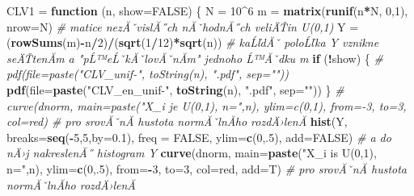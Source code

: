 \documentclass[
]{article}
\newenvironment{Shaded}{\begin{snugshade}}{\end{snugshade}}
\newcommand{\AttributeTok}[1]{\textcolor[rgb]{0.13,0.29,0.53}{#1}}
\newcommand{\CommentTok}[1]{\textcolor[rgb]{0.56,0.35,0.01}{\textit{#1}}}
\newcommand{\ConstantTok}[1]{\textcolor[rgb]{0.56,0.35,0.01}{#1}}
\newcommand{\ControlFlowTok}[1]{\textcolor[rgb]{0.13,0.29,0.53}{\textbf{#1}}}
\newcommand{\DecValTok}[1]{\textcolor[rgb]{0.00,0.00,0.81}{#1}}
\newcommand{\FloatTok}[1]{\textcolor[rgb]{0.00,0.00,0.81}{#1}}
\newcommand{\FunctionTok}[1]{\textcolor[rgb]{0.13,0.29,0.53}{\textbf{#1}}}
\newcommand{\NormalTok}[1]{#1}
\newcommand{\OtherTok}[1]{\textcolor[rgb]{0.56,0.35,0.01}{#1}}
\newcommand{\SpecialCharTok}[1]{\textcolor[rgb]{0.81,0.36,0.00}{\textbf{#1}}}
\newcommand{\StringTok}[1]{\textcolor[rgb]{0.31,0.60,0.02}{#1}}
\begin{document}
\begin{Shaded}
\begin{Highlighting}[]
\NormalTok{CLV1 }\OtherTok{=} \ControlFlowTok{function}\NormalTok{ (n, }\AttributeTok{show=}\ConstantTok{FALSE}\NormalTok{) \{}
\NormalTok{  N }\OtherTok{=} \DecValTok{10}\SpecialCharTok{\^{}}\DecValTok{6}
\NormalTok{  m }\OtherTok{=} \FunctionTok{matrix}\NormalTok{(}\FunctionTok{runif}\NormalTok{(n}\SpecialCharTok{*}\NormalTok{N, }\DecValTok{0}\NormalTok{,}\DecValTok{1}\NormalTok{), }\AttributeTok{nrow=}\NormalTok{N)     }\CommentTok{\# matice nezĂˇvislĂ˝ch nĂˇhodnĂ˝ch veliÄŤin U(0,1)}
\NormalTok{  Y }\OtherTok{=}\NormalTok{ (}\FunctionTok{rowSums}\NormalTok{(m)}\SpecialCharTok{{-}}\NormalTok{n}\SpecialCharTok{/}\DecValTok{2}\NormalTok{)}\SpecialCharTok{/}\NormalTok{(}\FunctionTok{sqrt}\NormalTok{(}\DecValTok{1}\SpecialCharTok{/}\DecValTok{12}\NormalTok{)}\SpecialCharTok{*}\FunctionTok{sqrt}\NormalTok{(n)) }\CommentTok{\# kaĹľdĂˇ poloĹľka Y vznikne seÄŤtenĂ­m a "pĹ™eĹˇkĂˇlovĂˇnĂ­m" jednoho Ĺ™Ăˇdku m}
  \ControlFlowTok{if}\NormalTok{ (}\SpecialCharTok{!}\NormalTok{show)  \{ }
\CommentTok{\#    pdf(file=paste("CLV\_unif{-}", toString(n), ".pdf", sep=""))}
    \FunctionTok{pdf}\NormalTok{(}\AttributeTok{file=}\FunctionTok{paste}\NormalTok{(}\StringTok{"CLV\_en\_unif{-}"}\NormalTok{, }\FunctionTok{toString}\NormalTok{(n), }\StringTok{".pdf"}\NormalTok{, }\AttributeTok{sep=}\StringTok{""}\NormalTok{))    }
\NormalTok{  \}}
\CommentTok{\#  curve(dnorm, main=paste("X\_i je U(0,1), n=",n), ylim=c(0,1), from={-}3, to=3, col=\textquotesingle{}red\textquotesingle{})        \# pro srovĂˇnĂ­ hustota normĂˇlnĂ­ho rozdÄ›lenĂ­ }
  \FunctionTok{hist}\NormalTok{(Y, }\AttributeTok{breaks=}\FunctionTok{seq}\NormalTok{(}\SpecialCharTok{{-}}\DecValTok{5}\NormalTok{,}\DecValTok{5}\NormalTok{,}\AttributeTok{by=}\FloatTok{0.1}\NormalTok{), }\AttributeTok{freq =} \ConstantTok{FALSE}\NormalTok{, }\AttributeTok{ylim=}\FunctionTok{c}\NormalTok{(}\DecValTok{0}\NormalTok{,.}\DecValTok{5}\NormalTok{), }\AttributeTok{add=}\ConstantTok{FALSE}\NormalTok{) }\CommentTok{\# a do nÄ›j nakreslenĂ˝ histogram Y}
  \FunctionTok{curve}\NormalTok{(dnorm, }\AttributeTok{main=}\FunctionTok{paste}\NormalTok{(}\StringTok{"X\_i is U(0,1), n="}\NormalTok{,n), }\AttributeTok{ylim=}\FunctionTok{c}\NormalTok{(}\DecValTok{0}\NormalTok{,.}\DecValTok{5}\NormalTok{), }\AttributeTok{from=}\SpecialCharTok{{-}}\DecValTok{3}\NormalTok{, }\AttributeTok{to=}\DecValTok{3}\NormalTok{, }\AttributeTok{col=}\StringTok{\textquotesingle{}red\textquotesingle{}}\NormalTok{, }\AttributeTok{add=}\NormalTok{T)        }\CommentTok{\# pro srovĂˇnĂ­ hustota normĂˇlnĂ­ho rozdÄ›lenĂ­   }
  

\end{Highlighting}
\end{Shaded}
\end{document}
